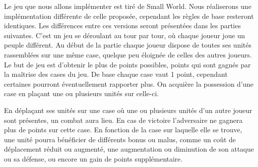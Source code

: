 Le jeu que nous allons implémenter est tiré de Small World. Nous réaliserons une implémentation différente de celle proposée, cependant les règles de base resteront identiques. Les différences entre ces versions seront présentées dans les parties suivantes.
C'est un jeu se déroulant au tour par tour, où chaque joueur joue un peuple différent. Au début de la partie chaque joueur dispose de toutes ses unités rassemblées sur une même case, quelque peu éloignée de celles des autres joueurs.
Le but de jeu est d'obtenir le plus de points possibles, points qui sont gagnés par la maîtrise des cases du jeu. De base chaque case vaut 1 point, cependant certaines pourront éventuellement rapporter plus. On acquière la possession d'une case en plaçant une ou plusieurs unités sur celle-ci.

En déplaçant ses unités sur une case où une ou plusieurs unités d'un autre joueur sont présentes, un combat aura lieu. En cas de victoire l'adversaire ne gagnera plus de points sur cette case.
En fonction de la case sur laquelle elle se trouve, une unité pourra bénéficier de différents bonus ou malus, comme un coût de déplacement réduit ou augmenté, une augmentation ou diminution de son attaque ou sa défense, ou encore un gain de points supplémentaire.